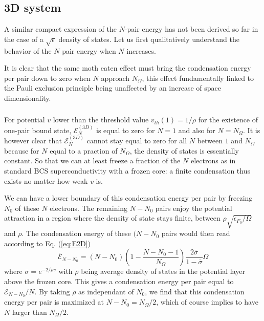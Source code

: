 \documentclass{article}
\newcommand{\sd}{{\ensuremath{{(3D)}}}}
\begin{document}
\subsection{3D system}
A similar compact expression of the $N$-pair energy has not been derived so far in the case of a $\sqrt{\epsilon}$ density of states. Let us first qualitatively understand the behavior of the $N$ pair energy when $N$ increases. 

It is clear that the same moth eaten effect must bring the condensation energy per pair down to zero when $N$ approach $N_\Omega$, this effect fundamentally linked to the Pauli exclusion principle being unaffected by an increase of space dimensionality. 

\subsubsection{}
For potential $v$ lower than the threshold value $v_{th}(1)=1/\rho$ for the existence of one-pair bound state, $\mathcal{E}_N^\sd$ is equal to zero for $N=1$ and also for $N=N_\Omega$.  It is however clear that $\mathcal{E}_N^\sd$ cannot stay equal to zero for all $N$ between $1$ and $N_\Omega$ because for $N$ equal to a praction of $N_\Omega$, the density of states is essentially constant.  So that we can at least freeze a fraction of the $N$ electrons as in standard BCS superconductivity with a frozen core: a finite condensation thus exists no matter how weak $v$ is. 

We can have a lower boundary of this condensation energy per pair by freezing $N_0$ of these $N$ electrons.  The remaining $N-N_0$ pairs enjoy the potential attraction in a region where the density of state stays finite, between $\rho\sqrt{\epsilon_{F_0}/\Omega}$ and $\rho$.  The condensation energy of these $(N-N_0$ pairs would then read according to Eq. (\ref{eq:E2D})
\begin{equation}\label{eq:E2D}
 \overline{\mathcal{E}}_{N-N_0}=(N-N_0)(1-\frac{N-N_0-1}{N_\Omega})\frac{2\bar\sigma}{1-\bar\sigma}\Omega
\end{equation}
where $\bar{\sigma}=e^{-2/{\bar{\rho}v}}$ with $\bar\rho$ being average density of states in the potential layer above the frozen core. This gives a condensation energy per pair equal to $\overline{\mathcal{E}}_{N-N_0}/N$.  By taking $\bar\rho$ as independant of $N_0$, we find that this condensation energy per pair is maximized at $N-N_0=N_\Omega/2$, which of course implies to have $N$ larger than $N_\Omega/2$. 

%

\end{document}
